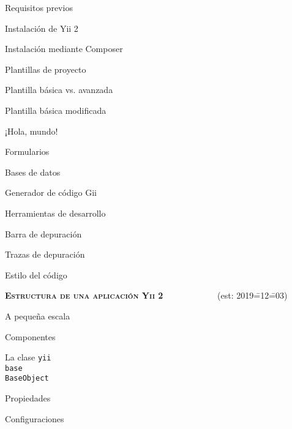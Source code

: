 \begin{longenum}
\begin{longenum}
        \begin{longenum}
            \item Requisitos previos
            \item Instalación de Yii 2
            \begin{longenum}
                \item Instalación mediante Composer
            \end{longenum}
            \item Plantillas de proyecto
            \begin{longenum}
                \item Plantilla básica vs. avanzada
                \item Plantilla básica modificada
            \end{longenum}
        \end{longenum}
        \item ¡Hola, mundo!
        \item Formularios
        \item Bases de datos
        \item Generador de código Gii
        \item Herramientas de desarrollo
        \begin{longenum}
            \item Barra de depuración
            \item Trazas de depuración
        \end{longenum}
        \item Estilo del código
    \end{longenum}
    \item \textbf{\textsc{Estructura de una aplicación Yii 2}} \ \ \ \ \ \ \ \ \ \ \ \ (est: 2019\==12\==03)
    \begin{longenum}
        \item A pequeña escala
        \begin{longenum}
            \item Componentes
            \begin{longenum}
                \item La clase \texttt{yii\\base\\BaseObject}
                \begin{longenum}
                    \item Propiedades
                    \item Configuraciones

\end{longenum}
\end{longenum}
\end{longenum}
\end{longenum}
\end{longenum}
